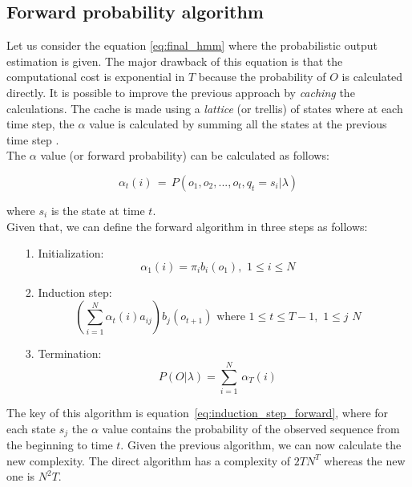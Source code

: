 \subsection{Forward probability algorithm}
Let us consider the equation \ref{eq:final_hmm} where the probabilistic output estimation is given. The major drawback of this equation is that the computational cost is exponential in $T$ because the probability of $O$ is calculated directly. It is possible to improve the previous approach by \textit{caching} the calculations. The cache is made using a \textit{lattice} (or trellis) of states where at each time step, the $\alpha$ value is calculated by summing all the states at the previous time step \cite{bourlard1994hidden}. \\

\noindent The $\alpha$ value (or forward probability) can be calculated as follows:

\begin{equation}
\label{eq:alpha_equation}
	\alpha_{t}(i) \, = \, P(o_{1}, o_{2}, ... , o_{t}, q_{t} = s_{i} | \lambda)
\end{equation}

\noindent where $s_{i}$ is the state at time $t$. \\
Given that, we can define the forward algorithm in three steps as follows:

\begin{itemize}
	\item[1.]{Initialization:} \\
		\begin{equation}
			\alpha_{1}(i) = \pi_{i}b_{i}(o_{1}), \,\, 1 \leq i \leq N
		\end{equation}
	\item[2.]{Induction step:} \\
		\begin{equation}
		\label{eq:induction_step_forward}
			\left ( \sum_{i=1}^{N} \alpha_{t}(i) a_{ij} \right ) b_{j}(o_{t+1}) \,\, \text{where} \,\, 1 \leq t \leq T - 1, \,\, 1 \leq j \,\, N
		\end{equation}
	\item[3.]{Termination:} \\
		\begin{equation}
			P(O|\lambda) = \sum_{i=1}^{N} \, \alpha_{T}(i)
		\end{equation}
\end{itemize}

\noindent The key of this algorithm is equation~\ref{eq:induction_step_forward}, where for each state $s_{j}$ the $\alpha$ value contains the probability of the observed sequence from the beginning to time $t$. Given the previous algorithm, we can now calculate the new complexity. The direct algorithm has a complexity of $2TN^{T}$ whereas the new one is $N^{2}T$.

